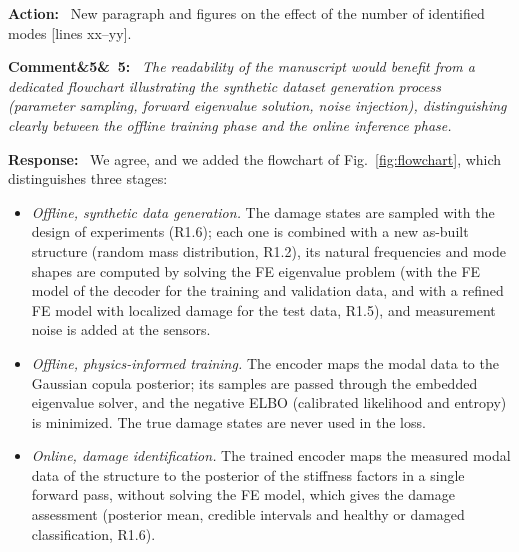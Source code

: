 \documentclass[11pt]{article}
\newenvironment{rcomment}[1]{\par\bigskip\noindent\textbf{Comment\ifx&#1&\else\ #1\fi:}\ \itshape}{\par}
\newenvironment{response}{\par\smallskip\noindent\color{resp}\textbf{Response:}\ }{\par}
\newenvironment{action}{\par\smallskip\noindent\color{resp}\textbf{Action:}\ }{\par}
\newcommand{\tbd}[1]{\textcolor{note}{\textsf{[#1]}}}
\newcommand{\lines}[1]{\tbd{lines #1}}
\begin{document}
\begin{action}
New paragraph and figures on the effect of the number of identified modes \lines{xx--yy}.
\end{action}

\begin{rcomment}{5}
The readability of the manuscript would benefit from a dedicated flowchart illustrating the synthetic dataset
generation process (parameter sampling, forward eigenvalue solution, noise injection), distinguishing clearly between
the offline training phase and the online inference phase.
\end{rcomment}

\begin{response}
We agree, and we added the flowchart of Fig.~\ref{fig:flowchart}, which distinguishes three stages:
\begin{itemize}[leftmargin=*]
\item \emph{Offline, synthetic data generation.} The damage states are sampled with the design of experiments (R1.6);
each one is combined with a new as-built structure (random mass distribution, R1.2), its natural frequencies and mode
shapes are computed by solving the FE eigenvalue problem (with the FE model of the decoder for the training and
validation data, and with a refined FE model with localized damage for the test data, R1.5), and measurement noise is
added at the sensors.
\item \emph{Offline, physics-informed training.} The encoder maps the modal data to the Gaussian copula posterior; its
samples are passed through the embedded eigenvalue solver, and the negative ELBO (calibrated likelihood and entropy) is
minimized. The true damage states are never used in the loss.
\item \emph{Online, damage identification.} The trained encoder maps the measured modal data of the structure to the
posterior of the stiffness factors in a single forward pass, without solving the FE model, which gives the damage
assessment (posterior mean, credible intervals and healthy or damaged classification, R1.6).
\end{itemize}
\end{response}
\end{document}
